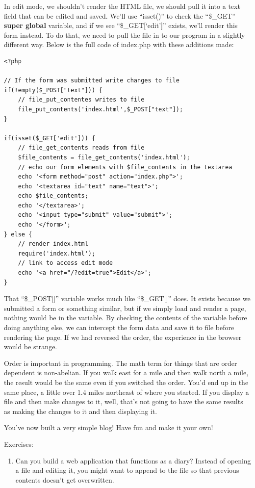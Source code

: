 \documentclass[
]{book}
\providecommand{\tightlist}{%
  \setlength{\itemsep}{0pt}\setlength{\parskip}{0pt}}
\begin{document}
In edit mode, we shouldn't render the HTML file, we should pull it into a text field that can be edited and saved. We'll use ``isset()'' to check the ``\$\_GET'' \textbf{super global} variable, and if we see ``\$\_GET{[}`edit'{]}'' exists, we'll render this form instead. To do that, we need to pull the file in to our program in a slightly different way. Below is the full code of index.php with these additions made:

\begin{verbatim}
<?php

// If the form was submitted write changes to file
if(!empty($_POST["text"])) {
    // file_put_contentes writes to file
    file_put_contents('index.html',$_POST["text"]);
}

if(isset($_GET['edit'])) {
    // file_get_contents reads from file
    $file_contents = file_get_contents('index.html');
    // echo our form elements with $file_contents in the textarea
    echo '<form method="post" action="index.php">';
    echo '<textarea id="text" name="text">';
    echo $file_contents;
    echo '</textarea>';
    echo '<input type="submit" value="submit">';
    echo '</form>';
} else {
    // render index.html
    require('index.html');
    // link to access edit mode
    echo '<a href="/?edit=true">Edit</a>';
}
\end{verbatim}

That ``\$\_POST{[}{]}'' variable works much like ``\$\_GET{[}{]}'' does. It exists because we submitted a form or something similar, but if we simply load and render a page, nothing would be in the variable. By checking the contents of the variable before doing anything else, we can intercept the form data and save it to file before rendering the page. If we had reversed the order, the experience in the browser would be strange.

Order is important in programming. The math term for things that are order dependent is non-abelian. If you walk east for a mile and then walk north a mile, the result would be the same even if you switched the order. You'd end up in the same place, a little over 1.4 miles northeast of where you started. If you display a file and then make changes to it, well, that's not going to have the same results as making the changes to it and then displaying it.

You've now built a very simple blog! Have fun and make it your own!

Exercises:

\begin{enumerate}
\def\labelenumi{\arabic{enumi}.}
\tightlist
\item
  Can you build a web application that functions as a diary? Instead of opening a file and editing it, you might want to append to the file so that previous contents doesn't get overwritten.
\end{enumerate}
\end{document}
